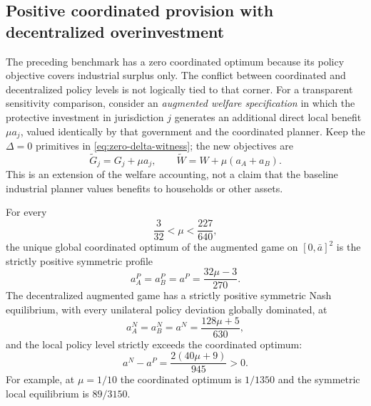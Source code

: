 \subsection{Positive coordinated provision with decentralized overinvestment}
\label{sec:positive-planner-extension}

The preceding benchmark has a zero coordinated optimum because its policy objective
covers industrial surplus only. The conflict between coordinated and decentralized
policy levels is not logically tied to that corner. For a transparent sensitivity
comparison, consider an \emph{augmented welfare specification} in which the
protective investment in jurisdiction $j$ generates an additional direct local
benefit $\mu a_j$, valued identically by that government and the coordinated
planner. Keep the $\Delta=0$ primitives in \eqref{eq:zero-delta-witness};
the new objectives are
\begin{equation}
\widetilde G_j=G_j+\mu a_j,\qquad
\widetilde W=W+\mu(a_A+a_B).
\label{eq:augmented-direct-benefit}
\end{equation}
This is an extension of the welfare accounting, not a claim that the baseline
industrial planner values benefits to households or other assets.

\begin{proposition}
\label{prop:positive-optimum-benchmark}
For every
\begin{equation}
\frac{3}{32}<\mu<\frac{227}{640},
\label{eq:mu-range}
\end{equation}
the unique global coordinated optimum of the augmented game on
$[0,\bar a]^2$ is the strictly positive symmetric profile
\begin{equation}
a^P_A=a^P_B=a^P=\frac{32\mu-3}{270}.
\end{equation}
The decentralized augmented game has a strictly positive symmetric Nash
equilibrium, with every unilateral policy deviation globally dominated,
at
\begin{equation}
a^N_A=a^N_B=a^N=\frac{128\mu+5}{630},
\end{equation}
and the local policy level strictly exceeds the coordinated optimum:
\begin{equation}
a^N-a^P=\frac{2(40\mu+9)}{945}>0.
\end{equation}
For example, at $\mu=1/10$ the coordinated optimum is $1/1350$ and
the symmetric local equilibrium is $89/3150$.
\end{proposition}

